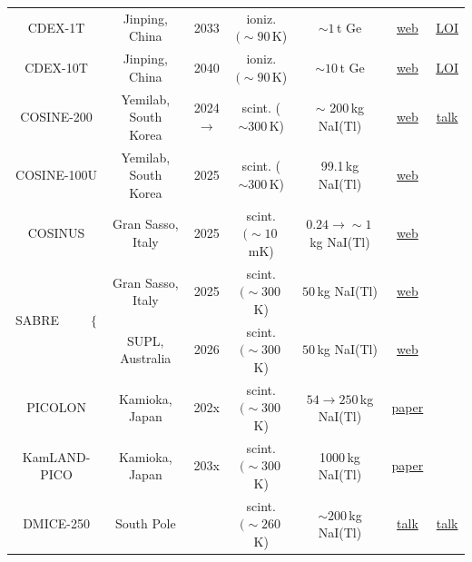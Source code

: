 \begin{table}[!t]
\begin{center}
{\begin{tabular}{ccccccc}
 { {\sc CDEX-1T}} & { Jinping, China } &  {2033}  &  { ioniz. $(\sim90\,$K)} & {$\sim 1$\,t Ge} &  \href{http://cdex.ep.tsinghua.edu.cn}{web} & \href{http://cdex.ep.tsinghua.edu.cn/upload_files/atta/1657037877563_E8.pdf}{LOI}  \\
 
 { {\sc CDEX-10T}} & { Jinping, China } & {2040} &  { ioniz. $(\sim90\,$K)} & {$\sim 10$\,t Ge} &  \href{http://cdex.ep.tsinghua.edu.cn}{web} & \href{http://cdex.ep.tsinghua.edu.cn/upload_files/atta/1657037877563_E8.pdf}{LOI}  \\

{\sc COSINE-200} & Yemilab, South Korea & 2024$\to$ &   scint. ($\sim300$\,K) & $\sim$ 200\,kg NaI(Tl) &  \href{http://cosine.yale.edu/home}{web} & \href{https://indico.sanfordlab.org/event/28/contributions/295/attachments/245/546/CoSSURF_COSINE.pdf}{talk} \\


{\sc COSINE-100U} & Yemilab, South Korea & 2025 &   scint. ($\sim300$\,K) &  99.1\,kg NaI(Tl) &  \href{http://cosine.yale.edu/home}{web} & \cite{COSINE-100U} \\

{\sc COSINUS} & Gran Sasso, Italy & 2025 &  scint. $(\sim10\,$mK)  &  $0.24\to\sim1$\,kg NaI(Tl) & \href{https://cosinus.sites.lngs.infn.it}{web} & \cite{COSINUS} \\

\multirow{2}{*}{{\sc SABRE}~~~~~$\Big\{$} & Gran Sasso, Italy & 2025 &  scint. $(\sim300\,$K) & $50\,$kg NaI(Tl) & \href{https://sabre.lngs.infn.it}{web} & \multirow{2}{*}{\cite{SABRE}}\\

 & SUPL, Australia & 2026 &   scint. $(\sim300\,$K) & $50\,$kg NaI(Tl) & \href{https://www.sabre-experiment.org.au}{web} & \\

{\sc PICOLON} & Kamioka, Japan  & 202x &  scint. $(\sim 300\,$K) & $54\to250\,$kg NaI(Tl) & \href{https://doi.org/10.1088/1742-6596/1468/1/012057}{paper} & \cite{PICOLON}
\\

{{\sc KamLAND-PICO}} & {Kamioka, Japan} & {203x} &  { scint. $(\sim300\,$K)} & {1000\,kg NaI(Tl)} & \href{https://doi.org/10.1088/1742-6596/1468/1/012057}{paper} & \cite{PICOLON}\\

{{\sc DMICE-250}} & {South Pole} &   &  { scint. $(\sim260\,$K)} & { $\sim200$\,kg NaI(Tl)}  &  \href{https://indico.sanfordlab.org/event/28/contributions/295/attachments/245/546/CoSSURF_COSINE.pdf}{talk} & \href{https://indico.sanfordlab.org/event/28/contributions/295/attachments/245/546/CoSSURF_COSINE.pdf}{talk} \\


\end{tabular}}
\end{center}
\end{table}
